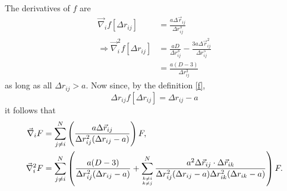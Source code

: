 \documentclass[a4paper,8pt]{article}
\begin{document}
The derivatives of $f$ are
\begin{align}
\vec{\nabla}_i f[\Delta{r}_{ij}] &= \frac{a\Delta\vec{r}_{ij}}{\Delta{r}_{ij}^3} \\
\Longrightarrow \vec{\nabla}_i^2 f[\Delta{r}_{ij}] &= \frac{aD}{\Delta{r}_{ij}^3}-\frac{3a\Delta\vec{r}_{ij}^2}{\Delta{r}_{ij}^5} \nonumber\\
&= \frac{a(D-3)}{\Delta{r}_{ij}^3}
\end{align}
as long as all $\Delta{r}_{ij} > a$. Now since, by the definition \eqref{f}, 
\begin{equation}
\Delta{r}_{ij} f[\Delta{r}_{ij}] = \Delta{r}_{ij}-a \nonumber
\end{equation}
it follows that
\begin{align}
\vec{\nabla}_i F &= \sum\limits_{j \neq i}^N \left(\frac{a\Delta\vec{r}_{ij}}{\Delta{r}_{ij}^2(\Delta{r}_{ij}-a)}\right) F, \label{grad_F}\\
\vec{\nabla}_i^2 F &= \sum\limits_{j \neq i}^N \left(\frac{a(D-3)}{\Delta{r}_{ij}^2(\Delta{r}_{ij}-a)} + \sum\limits_{{k \neq i}\atop{k \neq j}}^N \frac{a^2 \Delta\vec{r}_{ij} \cdot \Delta\vec{r}_{ik}}{\Delta{r}_{ij}^2(\Delta{r}_{ij}-a) \Delta{r}_{ik}^2(\Delta{r}_{ik}-a)}\right) F. \label{Lap_F}
\end{align}
\end{document}
